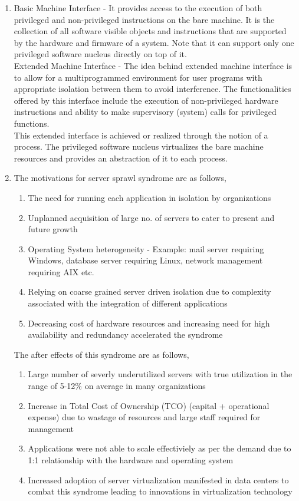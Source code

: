 \documentclass[11pt,a4paper,oneside]{article}
\begin{document}
\begin{enumerate}
		\item Basic Machine Interface - It provides access to the execution of both privileged and non-privileged instructions on the bare machine. It is the collection of all software visible objects and instructions that are supported by the hardware and firmware of a system. Note that it can support only one privileged software nucleus directly on top of it.\\
		
		      Extended Machine Interface - The idea behind extended machine interface is to allow for a multiprogrammed environment for user programs with appropriate isolation between them to avoid interference.  The functionalities offered by this interface include the execution of non-privileged hardware instructions and ability to make supervisory (system) calls for privileged functions. \\
		      
		      This extended interface is achieved or realized through the notion of a process. The privileged software nucleus virtualizes the bare machine resources and provides an abstraction of it to each process.
				  
		\item The motivations for server sprawl syndrome are as follows,
		     \begin{enumerate}
		     	\item The need for running each application in isolation by organizations	
		     	\item Unplanned acquisition of large no. of servers to cater to present and future growth
		     	\item Operating System heterogeneity - Example: mail server requiring Windows, database server requiring Linux, network management requiring AIX etc.
		     	\item Relying on coarse grained server driven isolation due to complexity associated with the integration of different applications 
		     	\item Decreasing cost of hardware resources and increasing need for high availability and redundancy accelerated the syndrome  	
		     \end{enumerate}
	          The after effects of this syndrome are as follows,
	          \begin{enumerate}
	          	\item Large number of severly underutilized servers with true utilization in the range of 5-12\% on average in many organizations
	          	\item Increase in Total Cost of Ownership (TCO) (capital + operational expense) due to wastage of resources and large staff required for management
	          	\item Applications were not able to scale effectiviely as per the demand due to 1:1 relationship with the hardware and operating system
	          	\item Increased adoption of server virtualization manifested in data centers to combat this syndrome leading to innovations in virtualization technology   	
	          \end{enumerate}
          

\end{enumerate}
\end{document}
